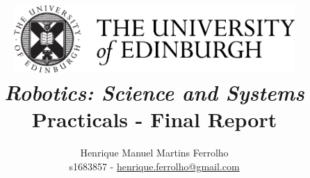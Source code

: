 \title{
    \includegraphics[width=0.8\textwidth]{res/university-of-edinburgh-logo.png}\\
    \bigskip\bigskip
    \bigskip\bigskip
    \bigskip\bigskip
    \huge{\textbf{\textit{Robotics: Science and Systems}}}\\
    \bigskip\bigskip
    \bigskip\bigskip
    \large\textbf{Practicals - Final Report}\\
    \bigskip\bigskip
    \bigskip\bigskip
    \bigskip\bigskip
    \bigskip\bigskip
    \bigskip\bigskip
    \bigskip\bigskip
}

\author{
    Henrique Manuel Martins Ferrolho\\
    s1683857 - \href{mailto:henrique.ferrolho@gmail.com}{henrique.ferrolho@gmail.com}
    \bigskip
}

\maketitle
\thispagestyle{empty}

\newpage
